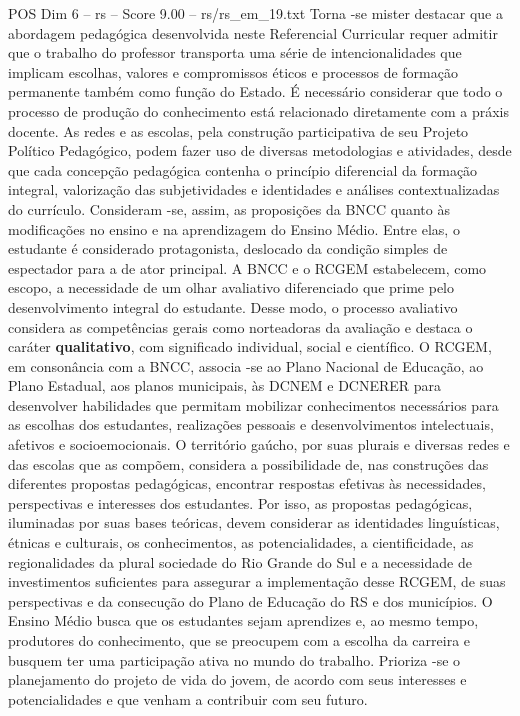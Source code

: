 \begin{textsample}{POS Dim 6 – rs – Score 9.00 – rs/rs\_em\_19.txt}
Torna -se mister destacar que a abordagem pedagógica desenvolvida neste Referencial Curricular requer admitir que o trabalho do professor transporta uma série de intencionalidades que implicam escolhas, valores e compromissos éticos e processos de formação permanente também como função do Estado.
É necessário considerar que todo o processo de produção do conhecimento está relacionado diretamente com a práxis docente.
As redes e as escolas, pela construção participativa de seu Projeto Político Pedagógico, podem fazer uso de diversas metodologias e atividades, desde que cada concepção pedagógica contenha o princípio diferencial da formação integral, valorização das subjetividades e identidades e análises contextualizadas do currículo.
Consideram -se, assim, as proposições da BNCC quanto às modificações no ensino e na aprendizagem do Ensino Médio.
Entre elas, o estudante é considerado protagonista, deslocado da condição simples de espectador para a de ator principal.
A BNCC e o RCGEM estabelecem, como escopo, a necessidade de um olhar avaliativo diferenciado que prime pelo desenvolvimento integral do estudante.
Desse modo, o processo avaliativo considera as competências gerais como norteadoras da avaliação e destaca o caráter \textbf{qualitativo}, com significado individual, social e científico.
O RCGEM, em consonância com a BNCC, associa -se ao Plano Nacional de Educação, ao Plano Estadual, aos planos municipais, às DCNEM e DCNERER para desenvolver habilidades que permitam mobilizar conhecimentos necessários para as escolhas dos estudantes, realizações pessoais e desenvolvimentos intelectuais, afetivos e socioemocionais.
O território gaúcho, por suas plurais e diversas redes e das escolas que as compõem, considera a possibilidade de, nas construções das diferentes propostas pedagógicas, encontrar respostas efetivas às necessidades, perspectivas e interesses dos estudantes.
Por isso, as propostas pedagógicas, iluminadas por suas bases teóricas, devem considerar as identidades linguísticas, étnicas e culturais, os conhecimentos, as potencialidades, a cientificidade, as regionalidades da plural sociedade do Rio Grande do Sul e a necessidade de investimentos suficientes para assegurar a implementação desse RCGEM, de suas perspectivas e da consecução do Plano de Educação do RS e dos municípios.
O Ensino Médio busca que os estudantes sejam aprendizes e, ao mesmo tempo, produtores do conhecimento, que se preocupem com a escolha da carreira e busquem ter uma participação ativa no mundo do trabalho.
Prioriza -se o planejamento do projeto de vida do jovem, de acordo com seus interesses e potencialidades e que venham a contribuir com seu futuro.

\end{textsample}
